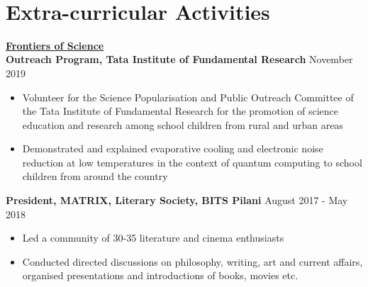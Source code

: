 \documentclass[margin, centered, 11pt]{res}
\begin{document}
\begin{resume}
\\
\section{Extra-curricular Activities}
\textbf{\href{http://www.tifr.res.in/~outreach/outreach/index.html}{Frontiers of Science}}\\
\textbf{Outreach Program, Tata Institute of Fundamental Research}
\hfill{November 2019 }
\begin{itemize}[noitemsep, label=\raisebox{0.35ex}{\tiny$\bullet$}]
\item Volunteer for the Science Popularisation and Public Outreach Committee of the Tata Institute of Fundamental Research for the promotion of science education and research among school children from rural and urban areas
\item Demonstrated and explained evaporative cooling and electronic noise reduction at low temperatures in the context of quantum computing to school children from around the country
\end{itemize}

\begin{comment}
\textbf{Corroboration and Review Committee, BITS Pilani}
\hfill{August 2016 - May 2018 }
\begin{itemize}[noitemsep, label=\raisebox{0.35ex}{\tiny$\bullet$}]
\item One of three members  (from a batch of 1000) of a constitutional and autonomous committee of the Students’ Union, BITS Pilani 
\item Oversaw annual budget allocation (of INR 1,500,000), financial management and auditing of all student run activities including the student organized festivals Oasis and APOGEE
\end{itemize}
\end{comment}

\textbf{President, MATRIX, Literary Society, BITS Pilani}
\hfill{August 2017 - May 2018}
\begin{itemize}[noitemsep, label=\raisebox{0.35ex}{\tiny$\bullet$}]
\item Led a community of 30-35 literature and cinema enthusiasts
\item Conducted directed discussions on philosophy, writing, art and current affairs, organised presentations and introductions of books, movies etc.  
\end{itemize}


\end{resume}
\end{document}
